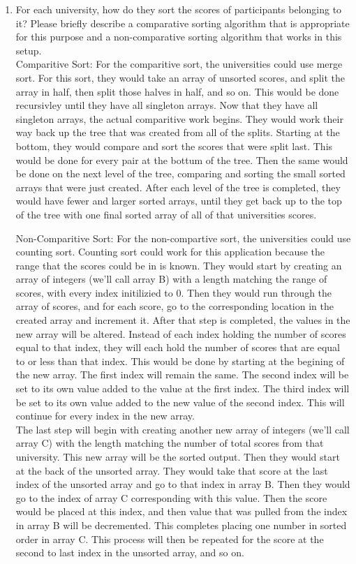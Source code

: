 \documentclass{article}
\begin{document}
\begin{enumerate}

\item For each university, how do they sort the scores of participants
  belonging to it? Please briefly describe a comparative sorting
  algorithm that is appropriate for this purpose and a non-comparative
  sorting algorithm that works in this setup.\\

Comparitive Sort:  For the comparitive sort, the universities could use merge sort.  For this sort, they would take an array of unsorted scores, and split the array in half, then split those halves in half, and so on.  This would be done recursivley until they have all singleton arrays.  Now that they have all singleton arrays, the actual comparitive work begins.  They would work their way back up the tree that was created from all of the splits.  Starting at the bottom, they would compare and sort the scores that were split last.  This would be done for every pair at the  bottum of the tree.  Then the same would be done on the next level of the tree, comparing and sorting the small sorted arrays that were just created.  After each level of the tree is completed, they would have fewer and larger sorted arrays, until they get back up to the top of the tree with one final sorted array of all of that universities scores.

Non-Comparitive Sort:  For the non-compartive sort, the universities could use counting sort.  Counting sort could work for this application because 
the range that the scores could be in is known.  They would start by creating an array of integers (we'll call array B) with a length matching the range of scores, with every index initilizied to 0. Then they would run through the array of scores, and for each score, go to the corresponding location in the created array and increment it.  After that step is completed, the values in the new array will be altered.  Instead of each index holding the number of scores equal to that index, they will each hold the number of scores that are equal to or less than that index.  This would be done by starting at the begining of the new array.  The first index will remain the same.  The second index will be set to its own value added to the value at the first index.  The third index will be set to its own value added to the new value of the second index.  This will continue for every index in the new array. \\ 
The last step will begin with creating another new array of integers (we'll call array C) with the length matching the number of total scores from that university.  This new array will be the sorted output.  Then they would start at the back of the unsorted array.  They would take that score at the last index of the unsorted array and go to that index in array B.  Then they would go to the index of array C corresponding with this value.  Then the score would be placed at this index, and then value that was pulled from the index in array B will be decremented.  This completes placing one number in sorted order in array C.  This process will then be repeated for the score at the second to last index in the unsorted array, and so on.


\end{enumerate}
\end{document}
